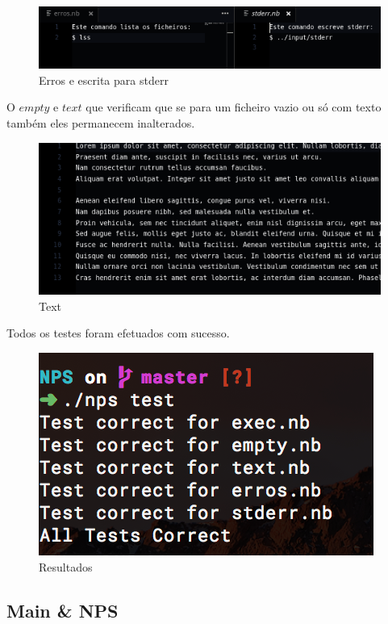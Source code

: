 \documentclass[a4paper]{article}
\begin{document}
\begin{figure}[H]
\centering
\includegraphics[scale=0.35]{imgs/erros.png}
\caption{Erros e escrita para stderr}
\label{img:Erros}
\end{figure}

O $empty$ e $text$ que verificam que se para um ficheiro vazio ou só com texto
também eles permanecem inalterados.

\begin{figure}[H]
\centering
\includegraphics[scale=0.35]{imgs/text.png}
\caption{Text}
\label{img:Text}
\end{figure}


Todos os testes foram efetuados com sucesso.

\begin{figure}[H]
\centering
\includegraphics[scale=0.35]{imgs/results.png}
\caption{Resultados}
\label{img:Resultados}
\end{figure}


\subsection{Main \& NPS}
\label{sec:mainandnps}
\end{document}
